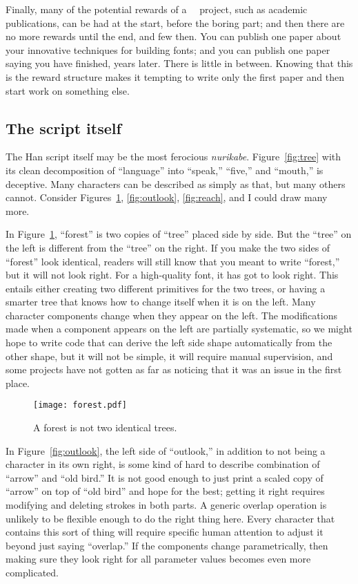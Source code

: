 \documentclass{ltugboat}
\begin{document}
Finally, many of the potential rewards of a \MF\ \CJK\ project, such as
academic publications, can be had at the start, before the boring part; and
then there are no more rewards until the end, and few then.  You can publish
one paper about your innovative techniques for building fonts; and you can
publish one paper saying you have finished, years later.  There is little in
between.  Knowing that this is the reward structure makes it tempting to
write only the first paper and then start work on something else.

\subsection{The script itself}

The Han script itself may be the most ferocious \emph{nurikabe}. 
Figure~\ref{fig:tree} with its clean decomposition of ``language'' into
``speak,'' ``five,'' and ``mouth,'' is deceptive.  Many characters can be
described as simply as that, but many others cannot.  Consider
Figures~\ref{fig:forest}, \ref{fig:outlook}, \ref{fig:reach}, and I could
draw many more.

In Figure~\ref{fig:forest}, ``forest'' is two copies of ``tree'' placed side
by side.  But the ``tree'' on the left is different from the ``tree'' on the
right.  If you make the two sides of ``forest'' look identical, readers will
still know that you meant to write ``forest,'' but it will not look right. 
For a high-quality font, it has got to look right.  This entails either
creating two different primitives for the two trees, or having a smarter
tree that knows how to change itself when it is on the left.  Many character
components change when they appear on the left.  The modifications made when
a component appears on the left are partially systematic, so we might hope
to write code that can derive the left side shape automatically from the
other shape, but it will not be simple, it will require manual supervision,
and some projects have not gotten as far as noticing that it was an
issue in the first place.

\begin{figure}
\texttt{[image: forest.pdf]}
\caption{A forest is not two identical trees.}
\label{fig:forest}
\end{figure}

In Figure~\ref{fig:outlook}, the left side of ``outlook,'' in addition to
not being a character in its own right, is some kind of hard to describe
combination of ``arrow'' and ``old bird.'' It is not good enough to just
print a scaled copy of ``arrow'' on top of ``old bird'' and hope for the
best; getting it right requires modifying and deleting strokes in both
parts.  A generic overlap operation is unlikely to be flexible enough to do
the right thing here.  Every character that contains this sort of thing will
require specific human attention to adjust it beyond just saying
``overlap.'' If the components change parametrically, then making sure they
look right for all parameter values becomes even more complicated.
\end{document}
